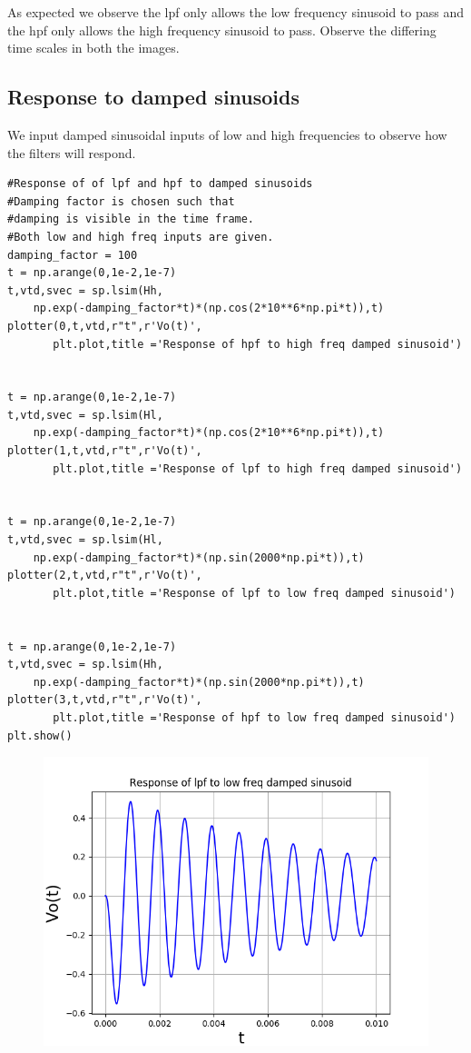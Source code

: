 \documentclass[11pt, a4paper]{article}
\begin{document}
{
As expected we observe the lpf only allows the low frequency sinusoid to pass and the hpf only allows the high frequency sinusoid to pass.
Observe the differing time scales in both the images.
}
\subsection{Response to damped sinusoids}
{
We input damped sinusoidal inputs of low and high frequencies to observe how the filters will respond.
}
\begin{verbatim}
#Response of of lpf and hpf to damped sinusoids
#Damping factor is chosen such that
#damping is visible in the time frame.
#Both low and high freq inputs are given.
damping_factor = 100
t = np.arange(0,1e-2,1e-7)
t,vtd,svec = sp.lsim(Hh,
    np.exp(-damping_factor*t)*(np.cos(2*10**6*np.pi*t)),t)
plotter(0,t,vtd,r"t",r'Vo(t)',
       plt.plot,title ='Response of hpf to high freq damped sinusoid')


t = np.arange(0,1e-2,1e-7)
t,vtd,svec = sp.lsim(Hl,
    np.exp(-damping_factor*t)*(np.cos(2*10**6*np.pi*t)),t)
plotter(1,t,vtd,r"t",r'Vo(t)',
       plt.plot,title ='Response of lpf to high freq damped sinusoid')


t = np.arange(0,1e-2,1e-7)
t,vtd,svec = sp.lsim(Hl,
    np.exp(-damping_factor*t)*(np.sin(2000*np.pi*t)),t)
plotter(2,t,vtd,r"t",r'Vo(t)',
       plt.plot,title ='Response of lpf to low freq damped sinusoid')


t = np.arange(0,1e-2,1e-7)
t,vtd,svec = sp.lsim(Hh,
    np.exp(-damping_factor*t)*(np.sin(2000*np.pi*t)),t)
plotter(3,t,vtd,r"t",r'Vo(t)',
       plt.plot,title ='Response of hpf to low freq damped sinusoid')
plt.show()
\end{verbatim}
\begin{figure}[!tbh]
   	\centering
   	\includegraphics[scale=0.5]{img7.png}
   	\label{fig:32}
   \end{figure}
\end{document}
